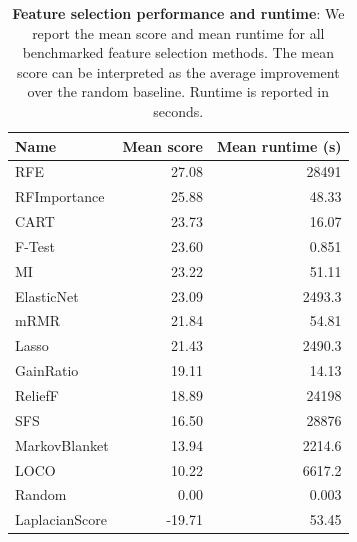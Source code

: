 \begin{table}[ht]
\caption{\textbf{Feature selection performance and runtime}: We report the mean score and mean runtime for all benchmarked feature selection methods. The mean score can be interpreted as the average improvement over the random baseline. Runtime is reported in seconds.}
\label{table-feature-selection-performance}
\centering
\small
\begin{tabular}{lrr}
\toprule
\textbf{Name} & \textbf{Mean score} & \textbf{Mean runtime (s)} \\
\midrule
RFE & 27.08 & 28491 \\
RFImportance & 25.88 & 48.33 \\
CART & 23.73 & 16.07 \\
F-Test & 23.60 & 0.851 \\
MI & 23.22 & 51.11 \\
ElasticNet & 23.09 & 2493.3 \\
mRMR & 21.84 & 54.81 \\
Lasso & 21.43 & 2490.3 \\
GainRatio & 19.11 & 14.13 \\
ReliefF & 18.89 & 24198 \\
SFS & 16.50 & 28876 \\
MarkovBlanket & 13.94 & 2214.6 \\
LOCO & 10.22 & 6617.2 \\
Random & 0.00 & 0.003 \\
LaplacianScore & -19.71 & 53.45 \\
\bottomrule
\end{tabular}
\end{table}